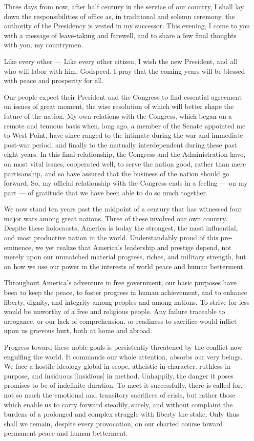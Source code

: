 \documentclass[a4paper]{amsbook}
\begin{document}
Three days from now, after half century in the service of our country, I shall lay down the responsibilities of office as, in traditional and solemn ceremony, the authority of the Presidency is vested in my successor. This evening, I come to you with a message of leave-taking and farewell, and to share a few final thoughts with you, my countrymen.

Like every other — Like every other citizen, I wish the new President, and all who will labor with him, Godspeed. I pray that the coming years will be blessed with peace and prosperity for all.

Our people expect their President and the Congress to find essential agreement on issues of great moment, the wise resolution of which will better shape the future of the nation. My own relations with the Congress, which began on a remote and tenuous basis when, long ago, a member of the Senate appointed me to West Point, have since ranged to the intimate during the war and immediate post-war period, and finally to the mutually interdependent during these past eight years. In this final relationship, the Congress and the Administration have, on most vital issues, cooperated well, to serve the nation good, rather than mere partisanship, and so have assured that the business of the nation should go forward. So, my official relationship with the Congress ends in a feeling — on my part — of gratitude that we have been able to do so much together.

We now stand ten years past the midpoint of a century that has witnessed four major wars among great nations. Three of these involved our own country. Despite these holocausts, America is today the strongest, the most influential, and most productive nation in the world. Understandably proud of this pre-eminence, we yet realize that America's leadership and prestige depend, not merely upon our unmatched material progress, riches, and military strength, but on how we use our power in the interests of world peace and human betterment.

Throughout America's adventure in free government, our basic purposes have been to keep the peace, to foster progress in human achievement, and to enhance liberty, dignity, and integrity among peoples and among nations. To strive for less would be unworthy of a free and religious people. Any failure traceable to arrogance, or our lack of comprehension, or readiness to sacrifice would inflict upon us grievous hurt, both at home and abroad.

Progress toward these noble goals is persistently threatened by the conflict now engulfing the world. It commands our whole attention, absorbs our very beings. We face a hostile ideology global in scope, atheistic in character, ruthless in purpose, and insiduous [insidious] in method. Unhappily, the danger it poses promises to be of indefinite duration. To meet it successfully, there is called for, not so much the emotional and transitory sacrifices of crisis, but rather those which enable us to carry forward steadily, surely, and without complaint the burdens of a prolonged and complex struggle with liberty the stake. Only thus shall we remain, despite every provocation, on our charted course toward permanent peace and human betterment.
\end{document}
